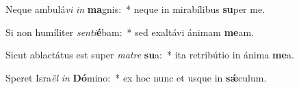 \item Neque ambulá\textit{vi} \textit{in} \textbf{ma}gnis:~* neque in mirabílibus \textbf{su}per me.
\item Si non humíliter \textit{sen}\textit{ti}\textbf{é}bam:~* sed exaltávi ánimam \textbf{me}am.
\item Sicut ablactátus est super \textit{ma}\textit{tre} \textbf{su}a:~* ita retribútio in ánima \textbf{me}a.
\item Speret Isra\textit{ël} \textit{in} \textbf{Dó}mino:~* ex hoc nunc et usque in \textbf{sǽ}culum.
